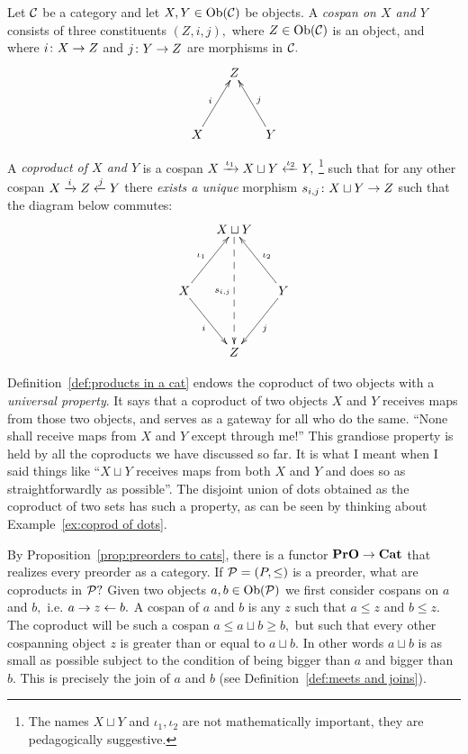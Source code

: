 \documentclass[../main/CT4S-EN-RU]{subfiles}
\begin{document}
\begin{definitionENG}\label{def:coproducts in a cat}
Let $\mathcal{C}$ be a category and let $X,Y\in\operatorname{Ob}(\mathcal{C})$ be objects. A {\em cospan on $X$ and $Y$} consists of three constituents $(Z,i,j),$ where $Z\in\operatorname{Ob}(\mathcal{C})$ is an object, and where $i\colon X\rightarrow Z$ and $j\colon Y\rightarrow Z$ are morphisms in $\mathcal{C}.$ 
$$\xymatrix@=15pt{&Z\\\\X\ar[ruu]^i&&Y\ar[luu]_j}$$   

A {\em coproduct of $X$ and $Y$} is a cospan $X\xrightarrow{\iota_1}X\sqcup Y\xleftarrow{\iota_2}Y,$ \footnote{The names $X\sqcup Y$ and $\iota_1,\iota_2$ are not mathematically important, they are pedagogically suggestive.} such that for any other cospan $X\xrightarrow{i}Z\xleftarrow{j}Y$ there {\em exists a unique} morphism $s_{i,j}\colon X\sqcup Y\rightarrow Z$ such that the diagram below commutes:
$$
\xymatrix@=15pt{&X\sqcup Y\ar@{-->}[dddd]_{s_{i,j}}\\\\X\ar[uur]^{\iota_1}\ar[ddr]_i&&Y\ar[uul]_{\iota_2}\ar[ddl]^j\\\\&Z}
$$
\end{definitionENG}

\begin{definitionRUS}\label{def:coproducts in a cat}
\end{definitionRUS}

\begin{remarkENG}
Definition~\ref{def:products in a cat} endows the coproduct of two objects with a {\em universal property}. It says that a coproduct of two objects $X$ and $Y$ receives maps from those two objects, and serves as a gateway for all who do the same. “None shall receive maps from $X$ and $Y$ except through me!” This grandiose property is held by all the coproducts we have discussed so far. It is what I meant when I said things like “$X\sqcup Y$ receives maps from both $X$ and $Y$ and does so as straightforwardly as possible”.  The disjoint union of dots obtained as the coproduct of two sets has such a property, as can be seen by thinking about Example~\ref{ex:coprod of dots}.
\end{remarkENG}

\begin{remarkRUS}
\end{remarkRUS}

\begin{exampleENG}
By Proposition~\ref{prop:preorders to cats}, there is a functor ${\mathbf{PrO}}\rightarrow{\mathbf{Cat}}$ that realizes every preorder as a category. If $\mathcal{P}=(P,\leq)$ is a preorder, what are coproducts in $\mathcal{P}?$ Given two objects $a,b\in\operatorname{Ob}(\mathcal{P})$ we first consider cospans on $a$ and $b,$ i.e. $a\rightarrow z\leftarrow b.$ A cospan of $a$ and $b$ is any $z$ such that $a\leq z$ and $b\leq z.$ The coproduct will be such a cospan $a\leq a\sqcup b\geq b,$ but such that every other cospanning object $z$ is greater than or equal to $a\sqcup b.$ In other words $a\sqcup b$ is as small as possible subject to the condition of being bigger than $a$ and bigger than $b.$ This is precisely the join of $a$ and $b$ (see Definition~\ref{def:meets and joins}).
\end{exampleENG}
\end{document}
